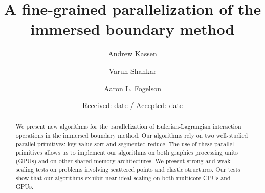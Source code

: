 \newcommand{\thrust}{\texttt{thrust}}
\newcommand{\term}[1]{\textit{#1}}

%


\title{%
    A fine-grained parallelization of the immersed boundary method
}


\author{Andrew Kassen \and Varun Shankar \and Aaron L. Fogelson}

\authorrunning{}


\date{Received: date / Accepted: date}



\maketitle

\begin{abstract}
We present new algorithms for the parallelization of Eulerian-Lagrangian interaction
operations in the immersed boundary method. Our algorithms rely on two well-studied
parallel primitives: key-value sort and segmented reduce. The use of these parallel
primitives allows us to implement our algorithms on both graphics processing units (GPUs)
and on other shared memory architectures. We present strong and weak scaling tests on
problems involving scattered points and elastic structures. Our tests show that our
algorithms exhibit near-ideal scaling on both multicore CPUs and GPUs\@.

\end{abstract}







